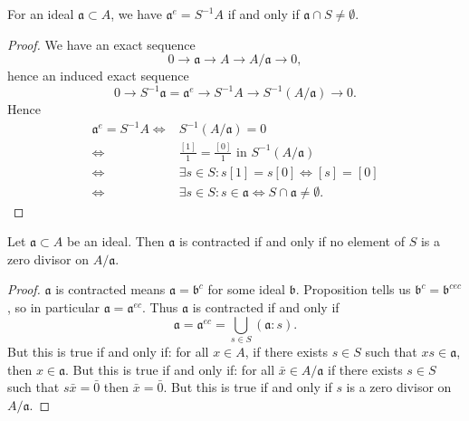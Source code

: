\documentclass[12pt]{article}
\begin{document}
\begin{proposition}
	For an ideal $\mathfrak{a}\subset A$, we have $\mathfrak{a}^e=S^{-1}A$ if and only if $\mathfrak{a}\cap S\neq\emptyset$.
\end{proposition}
\begin{proof}
	We have an exact sequence 
		\begin{equation*}
			0 \to \mathfrak{a} \to A \to A/\mathfrak{a} \to 0,
		\end{equation*}
		hence an induced exact sequence 
		\begin{equation*}
			0 \to S^{-1}\mathfrak{a}=\mathfrak{a}^e \to S^{-1}A \to S^{-1}(A/\mathfrak{a}) \to 0.
		\end{equation*}
		Hence 
		\begin{align*}
			\mathfrak{a}^e=S^{-1}A 
			\Leftrightarrow& S^{-1}(A/\mathfrak{a})=0 \\
			\Leftrightarrow& \frac{[1]}{1}=\frac{[0]}{1} \text{ in }S^{-1}(A/\mathfrak{a}) \\
			\Leftrightarrow& \exists s\in S : s[1]=s[0] \Leftrightarrow [s]=[0] \\
			\Leftrightarrow& \exists s\in S : s\in\mathfrak{a} \Leftrightarrow S\cap\mathfrak{a}\neq\emptyset.
		\end{align*}
\end{proof}

\begin{proposition}
	Let $\mathfrak{a}\subset A$ be an ideal. Then $\mathfrak{a}$ is contracted if and only if no element of $S$ is a zero divisor on $A/\mathfrak{a}$.
\end{proposition}
\begin{proof}
	$\mathfrak{a}$ is contracted means $\mathfrak{a}=\mathfrak{b}^c$ for some ideal $\mathfrak{b}$. Proposition  tells us $\mathfrak{b}^c=\mathfrak{b}^{cec}$, so in particular $\mathfrak{a}=\mathfrak{a}^{ec}$. Thus $\mathfrak{a}$ is contracted if and only if 
	\begin{equation*}
		\mathfrak{a} = \mathfrak{a}^{ec} = \bigcup_{s\in S}(\mathfrak{a}:s).
	\end{equation*}
	But this is true if and only if: for all $x\in A$, if there exists $s\in S$ such that $xs\in\mathfrak{a}$, then $x\in\mathfrak{a}$. But this is true if and only if: for all $\bar{x}\in A/\mathfrak{a}$ if there exists $s\in S$ such that $s\bar{x}=\bar{0}$ then $\bar{x}=\bar{0}$. But this is true if and only if $s$ is a zero divisor on $A/\mathfrak{a}$.
\end{proof}
\end{document}
